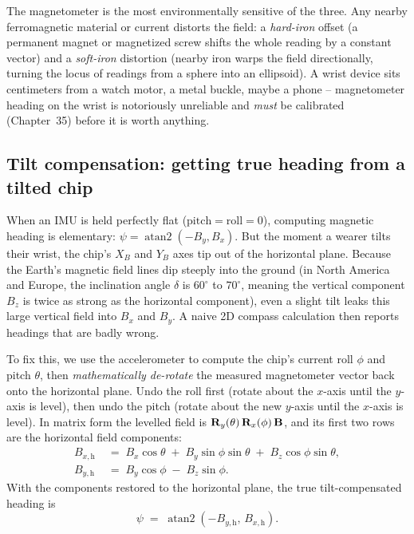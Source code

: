 \begin{trapbox}
The magnetometer is the most environmentally sensitive of the three. Any nearby ferromagnetic material or
current distorts the field: a \emph{hard-iron} offset (a permanent magnet or
magnetized screw shifts the whole reading by a constant vector) and a \emph{soft-iron}
distortion (nearby iron warps the field directionally, turning the locus of readings
from a sphere into an ellipsoid). A wrist device sits centimeters from a watch motor,
a metal buckle, maybe a phone -- magnetometer heading on the wrist is notoriously
unreliable and \emph{must} be calibrated (Chapter~35) before it is worth anything.
\end{trapbox}

\subsection{Tilt compensation: getting true heading from a tilted chip}
\label{ch34:mag-tilt-comp}

When an IMU is held perfectly flat ($\text{pitch}=\text{roll}=0$), computing magnetic heading
is elementary: $\psi = \operatorname{atan2}(-B_y, B_x)$. But the moment a wearer tilts their
wrist, the chip's $X_B$ and $Y_B$ axes tip out of the horizontal plane. Because the Earth's
magnetic field lines dip steeply into the ground (in North America and Europe, the inclination
angle $\delta$ is $60^\circ$ to $70^\circ$, meaning the vertical component $B_z$ is twice as strong
as the horizontal component), even a slight tilt leaks this large vertical field into $B_x$
and $B_y$. A naive 2D compass calculation then reports headings that are badly wrong.

To fix this, we use the accelerometer to compute the chip's current roll $\phi$ and pitch $\theta$,
then \emph{mathematically de-rotate} the measured magnetometer vector back onto the horizontal plane.
Undo the roll first (rotate about the $x$-axis until the $y$-axis is level), then undo the
pitch (rotate about the new $y$-axis until the $x$-axis is level). In matrix form the
levelled field is $\mathbf{R}_y(\theta)\,\mathbf{R}_x(\phi)\,\mathbf{B}$, and its first two rows are
the horizontal field components:
\begin{equation}
\label{ch34:eq-tilt-comp}
\begin{aligned}
  B_{x,\text{h}} &\;=\; B_x \cos\theta \;+\; B_y \sin\phi \sin\theta \;+\; B_z \cos\phi \sin\theta, \\
  B_{y,\text{h}} &\;=\; B_y \cos\phi \;-\; B_z \sin\phi .
\end{aligned}
\end{equation}
With the components restored to the horizontal plane, the true tilt-compensated heading is
\begin{equation}
\label{ch34:eq-heading}
  \psi \;=\; \operatorname{atan2}(-B_{y,\text{h}},\, B_{x,\text{h}}).
\end{equation}

